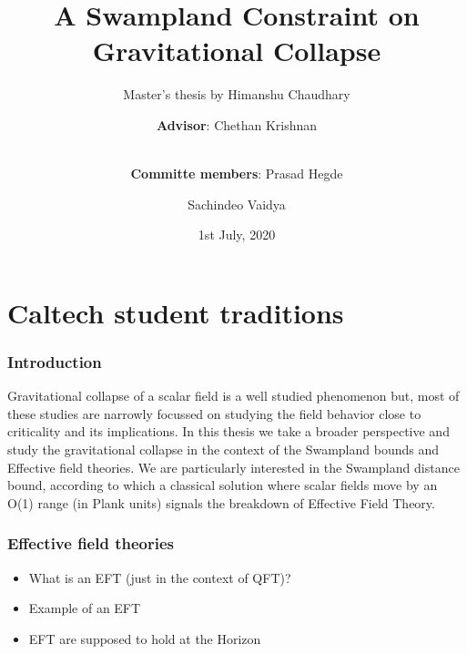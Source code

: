 \documentclass[hyperref={bookmarks=false},aspectratio=169]{beamer}
\title[A Swampland Constraint on Gravitational Collapse]
{\bfseries{A Swampland Constraint on Gravitational Collapse}}
\subtitle{Master's thesis by Himanshu Chaudhary}
\author[Himanshu Chaudhary]
{\textbf{Advisor}: Chethan Krishnan\inst{1}
\and \\
\textbf{Committe members}:
Prasad Hegde\inst{1} \and Sachindeo Vaidya\inst{1}
}
\institute[IISc]
{
  \inst{1}
  Center for High Energy Physics\\
  Indian Institute of Science
}
\date[IISc, 2020]
{1st July, 2020}
\begin{document}
\frame{\titlepage}  %



\section{Caltech student traditions}

\begin{frame}
  \frametitle{Introduction}
  Gravitational collapse of a scalar field is a well studied phenomenon but, most of
  these studies are narrowly focussed on studying the field behavior close to criticality
  and its implications. In this thesis we take a broader perspective and study the
  gravitational collapse in the context of the Swampland bounds and Effective field
  theories. We are particularly interested in the Swampland distance bound, according
  to which a classical solution where scalar fields move by an O(1) range (in Plank
  units) signals the breakdown of Effective Field Theory.



\end{frame}





\begin{frame}
  \frametitle{Effective field theories}

  \begin{itemize}
    \item What is an EFT (just in the context of QFT)?
    \item Example of an EFT
    \item EFT are supposed to hold at the Horizon
  \end{itemize}


\end{frame}
\end{document}
